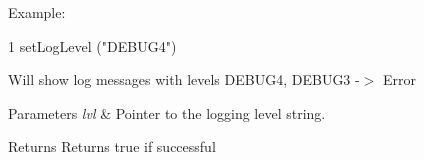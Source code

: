 Example\+:
\begin{DoxyCode}
1 setLogLevel ("DEBUG4") 
\end{DoxyCode}


Will show log messages with levels D\+E\+B\+U\+G4, D\+E\+B\+U\+G3 -\/$>$ Error


\begin{DoxyParams}{Parameters}
{\em lvl} & Pointer to the logging level string. \\
\hline
\end{DoxyParams}
\begin{DoxyReturn}{Returns}
Returns true if successful 
\end{DoxyReturn}
